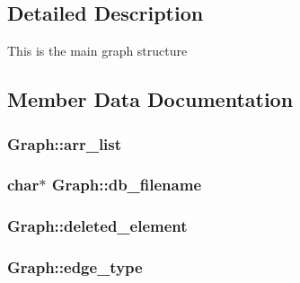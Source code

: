 \subsection{Detailed Description}
This is the main graph structure 

\subsection{Member Data Documentation}
\subsubsection[{\texorpdfstring{arr\+\_\+list}{arr_list}}]{ Graph\+::arr\+\_\+list}\hypertarget{structGraph_ac64d6e4ef7d5114a3a62ab7af945899b}{}\label{structGraph_ac64d6e4ef7d5114a3a62ab7af945899b}
\subsubsection[{\texorpdfstring{db\+\_\+filename}{db_filename}}]{\setlength{\rightskip}{0pt plus 5cm}char$\ast$ Graph\+::db\+\_\+filename}\hypertarget{structGraph_ac41ce58ccc9eee09e085dea4d8b28109}{}\label{structGraph_ac41ce58ccc9eee09e085dea4d8b28109}
\subsubsection[{\texorpdfstring{deleted\+\_\+element}{deleted_element}}]{ Graph\+::deleted\+\_\+element}\hypertarget{structGraph_aa7caab218b6903b9ae69fd7040ea93ce}{}\label{structGraph_aa7caab218b6903b9ae69fd7040ea93ce}
\subsubsection[{\texorpdfstring{edge\+\_\+type}{edge_type}}]{ Graph\+::edge\+\_\+type}\hypertarget{structGraph_abcebecd97e8916dd12100eb654754770}{}\label{structGraph_abcebecd97e8916dd12100eb654754770}
